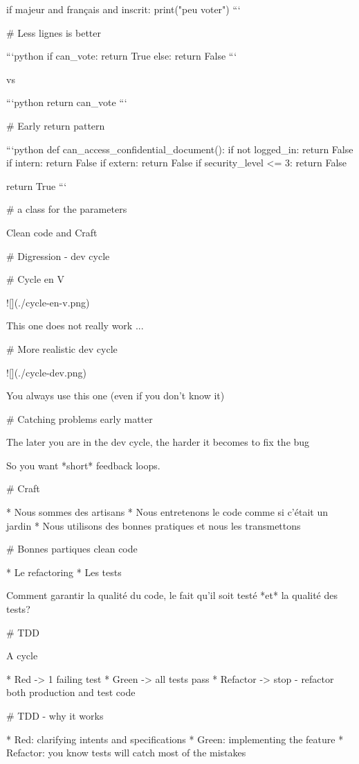 if majeur and français and inscrit:
    print("peu voter")
```

# Less lignes is better

```python
if can_vote:
    return True
else:
    return False
```

vs

```python
return can_vote
```

# Early return pattern

```python
def can_access_confidential_document():
    if not logged_in:
        return False
    if intern:
        return False
    if extern:
        return False
    if security_level <= 3:
        return False

    return True
```

# a class for the parameters

\huge \center Clean code and Craft

# Digression - dev cycle

# Cycle en V

![](./cycle-en-v.png)

This one does not really work ...

# More realistic dev cycle

![](./cycle-dev.png)

\vfill

You always use this one (even if you don't know it)

# Catching problems early matter

The later you are in the dev cycle, the harder
it becomes to fix the bug

So you want *short* feedback loops.

# Craft

* Nous sommes des artisans
* Nous entretenons le code comme si c'était un jardin
* Nous utilisons des bonnes pratiques et nous les transmettons

# Bonnes partiques clean code

* Le refactoring
* Les tests

Comment garantir la qualité du code, le fait qu'il soit testé *et* la qualité des tests?

# TDD

A cycle

* Red -> 1 failing test
* Green -> all tests pass
* Refactor -> stop - refactor both production and test code



# TDD - why it works

* Red: clarifying intents and specifications
* Green: implementing the feature
* Refactor: you know tests will catch most of the mistakes

